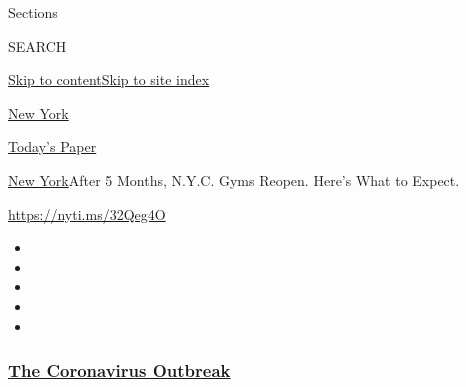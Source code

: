 Sections

SEARCH

\protect\hyperlink{site-content}{Skip to
content}\protect\hyperlink{site-index}{Skip to site index}

\href{https://www.nytimes3xbfgragh.onion/section/nyregion}{New York}

\href{https://myaccount.nytimes3xbfgragh.onion/auth/login?response_type=cookie\&client_id=vi}{}

\href{https://www.nytimes3xbfgragh.onion/section/todayspaper}{Today's
Paper}

\href{/section/nyregion}{New York}\textbar{}After 5 Months, N.Y.C. Gyms
Reopen. Here's What to Expect.

\url{https://nyti.ms/32Qeg4O}

\begin{itemize}
\item
\item
\item
\item
\item
\end{itemize}

\hypertarget{the-coronavirus-outbreak}{%
\subsubsection{\texorpdfstring{\href{https://www.nytimes3xbfgragh.onion/news-event/coronavirus?name=styln-coronavirus-national\&region=TOP_BANNER\&block=storyline_menu_recirc\&action=click\&pgtype=Article\&impression_id=a796d5e0-f2a4-11ea-9745-87ca264dc7a7\&variant=undefined}{The
Coronavirus
Outbreak}}{The Coronavirus Outbreak}}\label{the-coronavirus-outbreak}}

